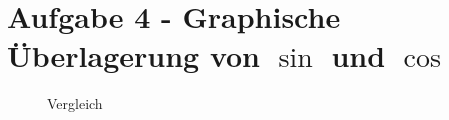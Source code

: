 \section{Aufgabe 4 - Graphische Überlagerung von $\sin$ und $\cos$}


\begin{figure}[h!]
  \begin{center}
  \end{center}
  \caption{Vergleich}
  \label{fig:vergleich}
\end{figure}


